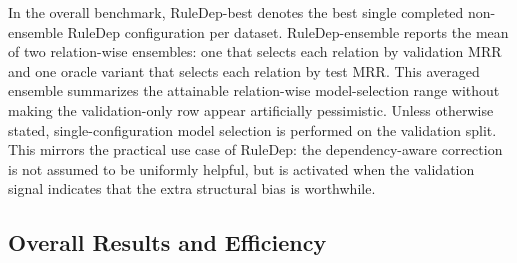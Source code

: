 In the overall benchmark, RuleDep-best denotes the best single completed non-ensemble RuleDep configuration per dataset. RuleDep-ensemble reports the mean of two relation-wise ensembles: one that selects each relation by validation MRR and one oracle variant that selects each relation by test MRR. This averaged ensemble summarizes the attainable relation-wise model-selection range without making the validation-only row appear artificially pessimistic. Unless otherwise stated, single-configuration model selection is performed on the validation split. This mirrors the practical use case of RuleDep: the dependency-aware correction is not assumed to be uniformly helpful, but is activated when the validation signal indicates that the extra structural bias is worthwhile.

\subsection{Overall Results and Efficiency}



